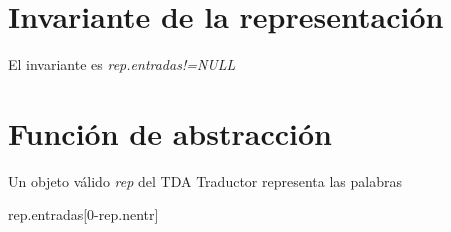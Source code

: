 \hypertarget{repConjuntoTraductor_invConjunto}{}\section{Invariante de la representación}\label{repConjuntoTraductor_invConjunto}
El invariante es {\itshape rep.\-entradas!=N\-U\-L\-L} \hypertarget{repConjuntoTraductor_faConjunto}{}\section{Función de abstracción}\label{repConjuntoTraductor_faConjunto}
Un objeto válido {\itshape rep} del T\-D\-A Traductor representa las palabras

rep.\-entradas\mbox{[}0-\/rep.\-nentr\mbox{]} 